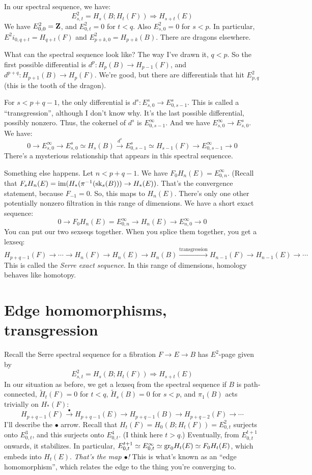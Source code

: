 In our spectral sequence, we have:
$$
E^2_{s,t} = H_s(B;H_t(F)) \Rightarrow H_{s+t}(E)
$$
We have $E^2_{0,0}=\mathbf Z$, and $E^2_{0,t} = 0$ for $t<q$.
Also $E^2_{s,0} = 0$ for $s<p$.
In particular, $E^2i_{0,q+t} = H_{q+t}(F)$ and $E^2_{p+k,0} = H_{p+k}(B)$.
There are dragons elsewhere.

What can the spectral sequence look like?
The way I've drawn it, $q<p$.
So the first possible differential is $d^{p}:H_p(B) \to H_{p-1}(F)$, and $d^{p+q}:H_{p+1}(B)\to H_{p}(F)$.
We're good, but there are differentials that hit $E^2_{p,q}$ (this is the tooth of the dragon).

For $s<p+q-1$, the only differential is $d^s:E^s_{s,0}\to E^s_{0,s-1}$.
This is called a ``transgression'', although I don't know why.
It's the last possible differential, possibly nonzero.
Thus, the cokernel of $d^s$ is $E^\infty_{0,s-1}$.
And we have $E^\infty_{s,0}\to E^s_{s,0}$.
We have:
$$
0\to E^\infty_{s,0}\to E^s_{s,0} \simeq H_s(B) \xrightarrow{d^s} E^s_{0,s-1}\simeq H_{s-1}(F) \to E^\infty_{0,s-1}\to 0
$$
There's a mysterious relationship that appears in this spectral sequencce.

Something else happens.
Let $n<p+q-1$.
We have $F_0 H_n(E) = E^\infty_{0,n}$.
(Recall that $F_s H_n(E) = \operatorname{im}(H_\ast(\pi^{-1}(\mathrm{sk}_s(B)))\to H_\ast(E))$.
That's the convergence statement, because $F_{-1} = 0$.
So, this maps to $H_n(E)$.
There's only one other potentially nonzero filtration in this range of dimensions.
We have a short exact sequence:
$$
0\to F_0 H_n(E) = E^\infty_{0,n} \to H_n(E) \to E^\infty_{n,0} \to 0
$$
You can put our two sexseqs together.
When you splice them together, you get a lexseq:
$$
H_{p+q-1}(F)\to \cdots\to H_n(F)\to H_n(E)\to H_n(B) \xrightarrow{\text{transgression}} H_{n-1}(F) \to H_{n-1}(E)\to \cdots
$$
This is called the \emph{Serre exact sequence}.
In this range of dimensions, homology behaves like homotopy.
\section{Edge homomorphisms, transgression}
Recall the Serre spectral sequence for a fibration $F\to E\to B$ has $E^2$-page given by
$$
E^2_{s,t} = H_s(B;H_t(F)) \Rightarrow H_{s+t}(E)
$$
In our situation as before, we get a lexseq from the spectral sequence if $B$ is path-connected, $\widetilde{H}_t(F) = 0$ for $t<q$, $\widetilde{H}_s(B) = 0$ for $s<p$, and $\pi_1(B)$ acts trivially on $H_\ast(F)$:
$$
H_{p+q-1}(F)\xrightarrow{\bullet} H_{p+q-1}(E)\to H_{p+q-1}(B)\to H_{p+q-2}(F)\to\cdots
$$
I'll describe the $\bullet$ arrow.
Recall that $H_t(F) = H_0(B;H_t(F)) = E^2_{0,t}$ surjects onto $E^3_{0,t}$, and this surjects onto $E^4_{0,t}$.
(I think here $t > q$.)
Eventually, from $E^{t+1}_{0,t}$ onwards, it stabilizes.
In particular, $E^{t+1}_{0,t} \simeq E^\infty_{0,t} \simeq \mathrm{gr}_0 H_t(E) \simeq F_0 H_t(E)$, which embeds into $H_t(E)$.
\emph{That's the map $\bullet$!}
This is what's known as an ``edge homomorphism'', which relates the edge to the thing you're converging to.

